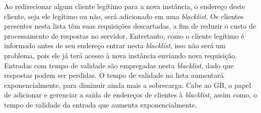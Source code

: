 Ao redirecionar algum cliente legítimo para a nova instância, o endereço deste cliente, seja ele legítimo ou não, será adicionado em uma \emph{blacklist}. Os clientes presentes nesta lista têm suas requisições descartadas, a fim de reduzir o custo de processamento de respostas no servidor. Entretanto, como o cliente legítimo é informado antes de seu endereço entrar nesta \emph{blacklist}, isso não será um problema, pois ele já terá acesso à nova instância enviando nova requisição. Entradas com tempo de validade são empregadas nesta \emph{blacklist}, dado que respostas podem ser perdidas. O tempo de validade na lista aumentará exponencialmente, para diminuir ainda mais a sobrecarga. Cabe ao GB, o papel de adicionar e gerenciar a saída de endereços de clientes à \emph{blacklist}, assim como, o tempo de validade da entrada que aumenta exponencialmente.


% 
% 
